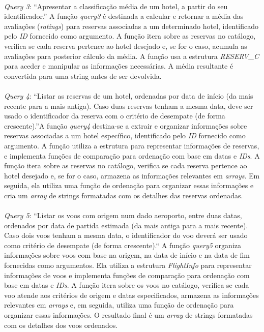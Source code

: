 \documentclass{article}
\begin{document}
\paragraph{}\textit{Query 3}: “Apresentar a classificação média de um hotel, a partir do seu identificador.”
A função \textit{query3} é destinada a calcular e retornar a média das avaliações (\textit{ratings}) para reservas associadas a um determinado hotel, identificado pelo \textit{ID} fornecido como argumento. A função itera sobre as reservas no catálogo, verifica se cada reserva pertence ao hotel desejado e, se for o caso, acumula as avaliações para posterior cálculo da média. A função usa a estrutura \textit{RESERV\_C} para aceder e manipular as informações necessárias. A média resultante é convertida para uma string antes de ser devolvida.
\paragraph{}\textit{Query 4}: “Listar as reservas de um hotel, ordenadas por data de início (da mais recente para a mais antiga). Caso duas reservas tenham a mesma data, deve ser usado o identificador da reserva com o critério de desempate (de forma crescente).”A função \textit{query4}  destina-se a extrair e organizar informações sobre reservas associadas a um hotel específico, identificado pelo \textit{ID} fornecido como argumento. A função utiliza  a estrutura para representar informações de reservas, e implementa funções de comparação para ordenação com base em datas e \textit{IDs}. A função itera sobre as reservas no catálogo, verifica se cada reserva pertence ao hotel desejado e, se for o caso, armazena as informações relevantes em \textit{arrays}. Em seguida, ela utiliza uma função de ordenação para organizar essas informações e cria um \textit{array} de strings formatadas com os detalhes das reservas ordenadas.
\paragraph{}\textit{Query 5}: “Listar os voos com origem num dado aeroporto, entre duas datas, ordenados por data de partida estimada (da mais antiga para a mais recente). Caso dois voos tenham a mesma data, o identificador do voo deverá ser usado como critério de desempate (de forma crescente).“
A função \textit{query5} organiza informações sobre voos com base na origem, na data de início e na data de fim fornecidas como argumentos. Ela utiliza a estrutura \textit{FlightInfo} para representar informações de voos e implementa funções de comparação para ordenação com base em datas e \textit{IDs}. A função itera sobre os voos no catálogo, verifica se cada voo atende aos critérios de origem e datas especificados, armazena as informações relevantes em \textit{arrays} e, em seguida, utiliza uma função de ordenação para organizar essas informações. O resultado final é um \textit{array} de strings formatadas com os detalhes dos voos ordenados.
\end{document}

